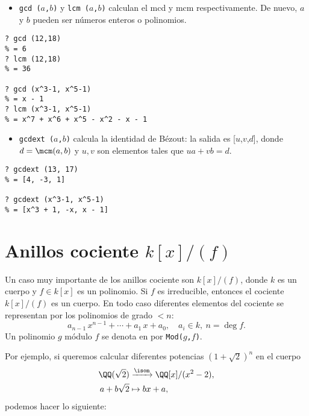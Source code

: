 \begin{itemize}
\item \texttt{gcd\,($a$,$b$)} y \texttt{lcm\,($a$,$b$)} calculan el mcd y mcm
  respectivamente. De nuevo, $a$ y $b$ pueden ser números enteros o polinomios.
\end{itemize}

\begin{framed}\footnotesize
\begin{verbatim}
? gcd (12,18)
% = 6
? lcm (12,18)
% = 36

? gcd (x^3-1, x^5-1)
% = x - 1
? lcm (x^3-1, x^5-1)
% = x^7 + x^6 + x^5 - x^2 - x - 1
\end{verbatim}
\end{framed}

\begin{itemize}
\item \texttt{gcdext\,($a$,$b$)} calcula la identidad de Bézout: la salida es
  [$u$,$v$,$d$], donde $d = \mcm (a,b)$ y $u,v$ son elementos tales que
  $ua + vb = d$.
\end{itemize}

\begin{framed}\footnotesize
\begin{verbatim}
? gcdext (13, 17)
% = [4, -3, 1]

? gcdext (x^3-1, x^5-1)
% = [x^3 + 1, -x, x - 1]
\end{verbatim}
\end{framed}


\section{Anillos cociente $k [x]/(f)$}

Un caso muy importante de los anillos cociente son $k [x]/(f)$, donde $k$ es
un cuerpo y $f \in k [x]$ es un polinomio. Si $f$ es irreducible, entonces
el cociente $k [x]/(f)$ es un cuerpo. En todo caso diferentes elementos
del cociente se representan por los polinomios de grado $<n$:
$$a_{n-1}\,x^{n-1} + \cdots + a_1\,x + a_0, \quad a_i \in k, ~ n = \deg f.$$
Un polinomio $g$ módulo $f$ se denota en \gp{} por \texttt{Mod($g$,$f$)}.

Por ejemplo, si queremos calcular diferentes potencias $(1+\sqrt{2})^n$ en
el cuerpo
\begin{align*}
  \QQ (\sqrt{2}) & \xrightarrow{\isom} \QQ [x]/(x^2-2),\\
  a + b\sqrt{2} & \mapsto bx + a,
\end{align*}
podemos hacer lo siguiente:

